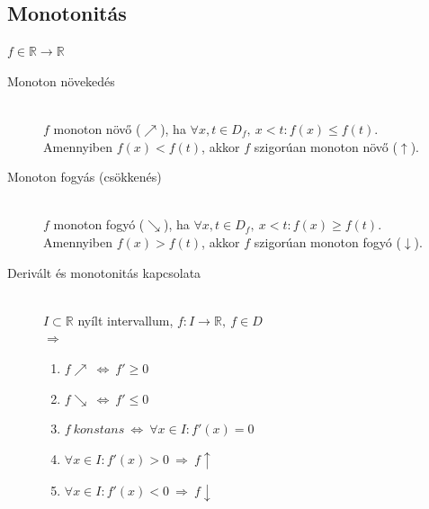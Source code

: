 \documentclass[margin=0px]{article}
\newcommand{\R}{\mathbb{R}}
\begin{document}
		\subsection{Monotonitás}
			$ f\in \R \rightarrow \R $
			\begin{description}
				\item[Monoton növekedés] \hfill \\
					$ f $ monoton növő ($\nearrow$), ha $\forall x,t \in D_f, \ x < t : f(x) \leq f(t) $. \\
					Amennyiben $  f(x) < f(t) $, akkor $f$ szigorúan monoton növő ($\uparrow$).
				\item[Monoton fogyás (csökkenés)] \hfill \\
					$ f $ monoton fogyó ($\searrow$), ha $\forall x,t \in D_f, \ x < t : f(x) \geq f(t) $. \\
					Amennyiben $  f(x) > f(t) $, akkor $f$ szigorúan monoton fogyó ($\downarrow$).
				\item[Derivált és monotonitás kapcsolata] \hfill \\
					$ I \subset \R $ nyílt intervallum, $ f:I\rightarrow \R, \ f \in D$\\
					$\Rightarrow$
					\begin{enumerate}
						\item $ f \nearrow \ \Leftrightarrow \ f' \geq 0$
						\item $ f \searrow \ \Leftrightarrow \ f' \leq 0$
						\item $ f \ konstans \ \Leftrightarrow \ \forall x \in I : f'(x) = 0$
						\item $ \forall x \in I : f'(x) > 0 \ \Rightarrow  \ f \uparrow $
						\item $ \forall x \in I : f'(x) < 0 \ \Rightarrow  \ f \downarrow $
					\end{enumerate}
			\end{description}
\end{document}
